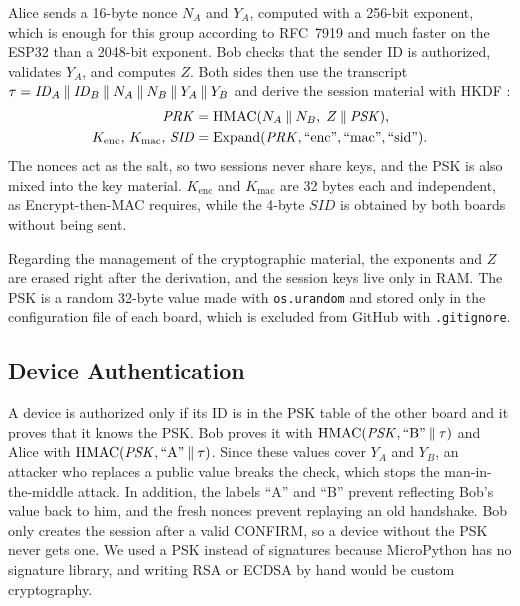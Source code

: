 \documentclass[11pt,a4paper]{article}
\begin{document}
Alice sends a 16-byte nonce $N_A$ and $Y_A$, computed with a 256-bit exponent,
which is enough for this group according to RFC~7919 \cite{rfc7919} and much
faster on the ESP32 than a 2048-bit exponent. Bob checks that the sender ID is
authorized, validates $Y_A$, and computes $Z$. Both sides then use the
transcript
$\tau = \mathit{ID}_A \mathbin\Vert \mathit{ID}_B \mathbin\Vert N_A \mathbin\Vert N_B \mathbin\Vert Y_A \mathbin\Vert Y_B$
and derive the session material with HKDF \cite{rfc5869}:
\begin{equation}
    \begin{aligned}
        \mathit{PRK} &= \mathrm{HMAC}(N_A \mathbin\Vert N_B,\; Z \mathbin\Vert \mathit{PSK}), \\
        K_{\mathrm{enc}},\, K_{\mathrm{mac}},\, \mathit{SID} &=
        \mathrm{Expand}(\mathit{PRK}, \text{``enc''}, \text{``mac''}, \text{``sid''}).
    \end{aligned}
    \label{eq:hkdf}
\end{equation}
The nonces act as the salt, so two sessions never share keys, and the PSK is
also mixed into the key material. $K_{\mathrm{enc}}$ and $K_{\mathrm{mac}}$ are
32 bytes each and independent, as Encrypt-then-MAC requires, while the 4-byte
$\mathit{SID}$ is obtained by both boards without being sent.

Regarding the management of the cryptographic material, the exponents and $Z$
are erased right after the derivation, and the session keys live only in RAM.
The PSK is a random 32-byte value made with \texttt{os.urandom} and stored only
in the configuration file of each board, which is excluded from GitHub with
\texttt{.gitignore}.

\subsection{Device Authentication}

A device is authorized only if its ID is in the PSK table of the other board
and it proves that it knows the PSK. Bob proves it with
$\mathrm{HMAC}(\mathit{PSK}, \text{``B''} \mathbin\Vert \tau)$ and Alice with
$\mathrm{HMAC}(\mathit{PSK}, \text{``A''} \mathbin\Vert \tau)$. Since these values
cover $Y_A$ and $Y_B$, an attacker who replaces a public value breaks the check,
which stops the man-in-the-middle attack. In addition, the labels ``A'' and
``B'' prevent reflecting Bob's value back to him, and the fresh nonces prevent
replaying an old handshake. Bob only creates the session after a valid
CONFIRM, so a device without the PSK never gets one. We used a PSK instead of
signatures because MicroPython has no signature library, and writing RSA or
ECDSA by hand would be custom cryptography.
\end{document}
